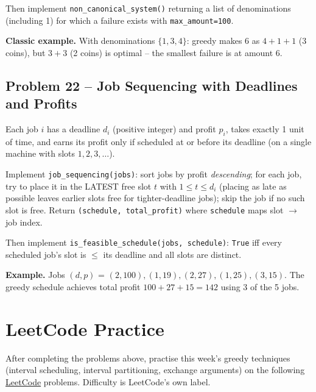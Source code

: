 \documentclass[11pt]{article}
\begin{document}
Then implement \texttt{non\_canonical\_system()} returning a list of denominations
(including 1) for which a failure exists with \texttt{max\_amount=100}.

\textbf{Classic example.} With denominations $\{1, 3, 4\}$: greedy makes $6$ as $4+1+1$
(3 coins), but $3+3$ (2 coins) is optimal -- the smallest failure is at amount $6$.

\subsection*{Problem 22 -- Job Sequencing with Deadlines and Profits}

Each job $i$ has a deadline $d_i$ (positive integer) and profit $p_i$, takes exactly 1
unit of time, and earns its profit only if scheduled at or before its deadline (on a
single machine with slots $1, 2, 3, \ldots$).

Implement \texttt{job\_sequencing(jobs)}: sort jobs by profit \emph{descending}; for each
job, try to place it in the LATEST free slot $t$ with $1 \le t \le d_i$ (placing as late
as possible leaves earlier slots free for tighter-deadline jobs); skip the job if no such
slot is free. Return \texttt{(schedule, total\_profit)} where \texttt{schedule} maps slot
$\to$ job index.

Then implement \texttt{is\_feasible\_schedule(jobs, schedule)}: \texttt{True} iff every
scheduled job's slot is $\le$ its deadline and all slots are distinct.

\textbf{Example.} Jobs $(d,p)$ = $(2,100), (1,19), (2,27), (1,25), (3,15)$. The greedy
schedule achieves total profit $100 + 27 + 15 = 142$ using 3 of the 5 jobs.

\newpage
\section{LeetCode Practice}

After completing the problems above, practise this week's greedy techniques (interval
scheduling, interval partitioning, exchange arguments) on the following
\href{https://leetcode.com}{LeetCode} problems. Difficulty is LeetCode's own label.
\end{document}
